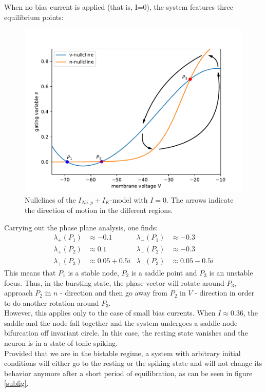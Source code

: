 \documentclass[12pt,a4paper]{article}
\begin{document}
When no bias current is applied (that is, I=0), the system features three equilibrium points:
\begin{figure}[H]
	\centering
	\includegraphics[scale=0.95]{inapikrealncwnp.pdf}\caption{Nullclines of the $I_{Na,p}+I_K$-model with $I=0$. The arrows indicate the direction of motion in the different regions.}
	\label{realnc}
\end{figure}
Carrying out the phase plane analysis, one finds:
\begin{align*}
\lambda_+(P_1)&\approx-0.1 & \lambda_-(P_1)&\approx-0.3\\
\lambda_+(P_2)&\approx 0.1& \lambda_-(P_2)&\approx -0.3\\
\lambda_+(P_3)&\approx 0.05 + 0.5i& \lambda_-(P_3)&\approx 0.05 - 0.5i
\end{align*}
This means that $P_1$ is a stable node, $P_2$ is a saddle point and $P_3$ is an unstable focus. Thus, in the bursting state, the phase vector will rotate around $P_3$, approach $P_2$ in $n$ - direction and then go away from $P_2$ in $V$ - direction in order to do another rotation around $P_3$.\\
However, this applies only to the case of small bias currents. When $I\approx 0.36$, the saddle and the node fall together and the system undergoes a saddle-node bifurcation off invariant circle. In this case, the resting state vanishes and the neuron is in a state of tonic spiking.
\\
Provided that we are in the bistable regime, a system with arbitrary initial conditions will either go to the resting or the spiking state and will not change its behavior anymore after a short period of equilibration, as can be seen in figure \ref{subfig}. 
\end{document}
